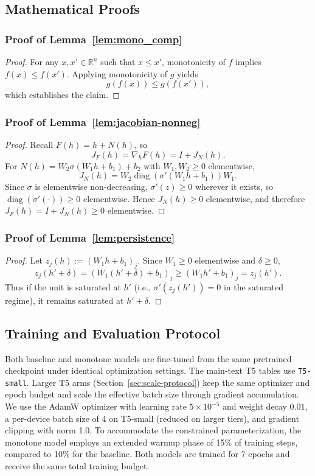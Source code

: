 \documentclass{article}
\theoremstyle{plain}
\theoremstyle{definition}
\theoremstyle{remark}
\begin{document}
\subsection{Mathematical Proofs}
\subsubsection{Proof of Lemma~\ref{lem:mono_comp}}
\label{prf:lem1}
\begin{proof}
For any $x, x' \in \mathbb{R}^n$ such that $x \le x'$, monotonicity of $f$ implies $f(x) \le f(x')$. Applying monotonicity of $g$ yields
\[
g(f(x)) \le g(f(x')),
\]
which establishes the claim.
\end{proof}

\subsubsection{Proof of Lemma~\ref{lem:jacobian-nonneg}}

\label{prf:jac}
\begin{proof}
Recall $F(h)=h+N(h)$, so
\[
J_F(h)=\nabla_h F(h)=I + J_N(h).
\]
For $N(h)=W_2 \sigma(W_1 h + b_1)+b_2$ with $W_1,W_2\ge 0$ elementwise,
\[
J_N(h)=W_2 \operatorname{diag}(\sigma'(W_1 h + b_1)) W_1.
\]
Since $\sigma$ is elementwise non-decreasing, $\sigma'(z)\ge 0$ wherever it exists,
so $\operatorname{diag}(\sigma'(\cdot))\ge 0$ elementwise. Hence $J_N(h)\ge 0$
elementwise, and therefore $J_F(h)=I+J_N(h)\ge 0$ elementwise.
\end{proof}

\subsubsection{Proof of Lemma~\ref{lem:persistence}}
\label{prf:persis}
\begin{proof}
Let $z_j(h) := (W_1 h + b_1)_j$. Since $W_1\ge 0$ elementwise and $\delta\ge 0$,
\[
z_j(h' + \delta) = (W_1(h' + \delta) + b_1)_j \ge (W_1 h' + b_1)_j = z_j(h').
\]
Thus if the unit is saturated at $h'$ (i.e., $\sigma'(z_j(h'))=0$ in the saturated
regime), it remains saturated at $h'+\delta$.
\end{proof}

\subsection{Training and Evaluation Protocol}
\label{app:training}
Both baseline and monotone models are fine-tuned from the same pretrained checkpoint under identical optimization settings. The main-text T5 tables use \texttt{T5-small}. Larger T5 arms (Section~\ref{sec:scale-protocol}) keep the same optimizer and epoch budget and scale the effective batch size through gradient accumulation. We use the AdamW optimizer with learning rate $5 \times 10^{-5}$ and weight decay $0.01$, a per-device batch size of 4 on T5-small (reduced on larger tiers), and gradient clipping with norm 1.0. To accommodate the constrained parameterization, the monotone model employs an extended warmup phase of 15\% of training steps, compared to 10\% for the baseline. Both models are trained for 7 epochs and receive the same total training budget.
\end{document}

